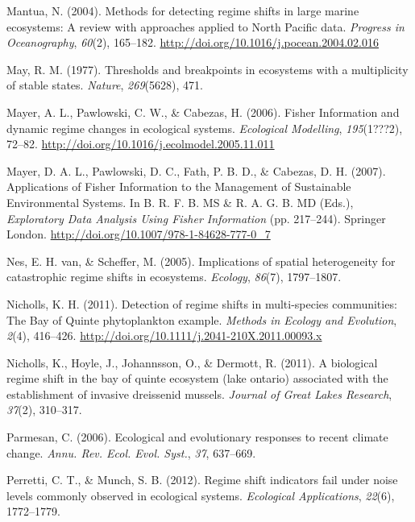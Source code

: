 \documentclass[12pt,twoside,openany]{reedthesis}
\begin{document}
\leavevmode\hypertarget{ref-mantua_methods_2004}{}%
Mantua, N. (2004). Methods for detecting regime shifts in large marine ecosystems: A review with approaches applied to North Pacific data. \emph{Progress in Oceanography}, \emph{60}(2), 165--182. \url{http://doi.org/10.1016/j.pocean.2004.02.016}

\leavevmode\hypertarget{ref-may1977thresholds}{}%
May, R. M. (1977). Thresholds and breakpoints in ecosystems with a multiplicity of stable states. \emph{Nature}, \emph{269}(5628), 471.

\leavevmode\hypertarget{ref-mayer_fisher_2006}{}%
Mayer, A. L., Pawlowski, C. W., \& Cabezas, H. (2006). Fisher Information and dynamic regime changes in ecological systems. \emph{Ecological Modelling}, \emph{195}(1???2), 72--82. \url{http://doi.org/10.1016/j.ecolmodel.2005.11.011}

\leavevmode\hypertarget{ref-mayer_applications_2007}{}%
Mayer, D. A. L., Pawlowski, D. C., Fath, P. B. D., \& Cabezas, D. H. (2007). Applications of Fisher Information to the Management of Sustainable Environmental Systems. In B. R. F. B. MS \& R. A. G. B. MD (Eds.), \emph{Exploratory Data Analysis Using Fisher Information} (pp. 217--244). Springer London. \url{http://doi.org/10.1007/978-1-84628-777-0_7}

\leavevmode\hypertarget{ref-van2005implications}{}%
Nes, E. H. van, \& Scheffer, M. (2005). Implications of spatial heterogeneity for catastrophic regime shifts in ecosystems. \emph{Ecology}, \emph{86}(7), 1797--1807.

\leavevmode\hypertarget{ref-nicholls_detection_2011}{}%
Nicholls, K. H. (2011). Detection of regime shifts in multi-species communities: The Bay of Quinte phytoplankton example. \emph{Methods in Ecology and Evolution}, \emph{2}(4), 416--426. \url{http://doi.org/10.1111/j.2041-210X.2011.00093.x}

\leavevmode\hypertarget{ref-nicholls2011biological}{}%
Nicholls, K., Hoyle, J., Johannsson, O., \& Dermott, R. (2011). A biological regime shift in the bay of quinte ecosystem (lake ontario) associated with the establishment of invasive dreissenid mussels. \emph{Journal of Great Lakes Research}, \emph{37}(2), 310--317.

\leavevmode\hypertarget{ref-parmesan_ecological_2006}{}%
Parmesan, C. (2006). Ecological and evolutionary responses to recent climate change. \emph{Annu. Rev. Ecol. Evol. Syst.}, \emph{37}, 637--669.

\leavevmode\hypertarget{ref-perretti2012regime}{}%
Perretti, C. T., \& Munch, S. B. (2012). Regime shift indicators fail under noise levels commonly observed in ecological systems. \emph{Ecological Applications}, \emph{22}(6), 1772--1779.
\end{document}
